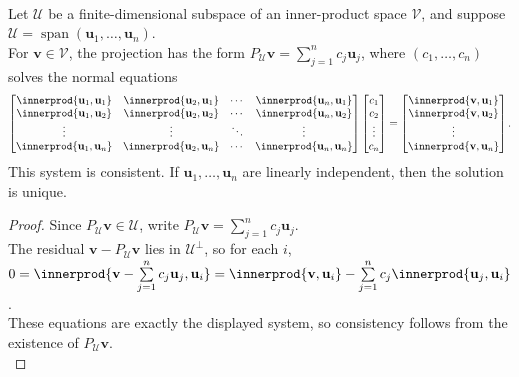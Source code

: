 \begin{theorem} \label{thm:normal-equations-for-projection} \\
Let $\mathcal{U}$ be a finite-dimensional subspace of an inner-product space $\mathcal{V}$, and suppose $\mathcal{U}=\operatorname{span}(\mathbf{u}_1,\ldots,\mathbf{u}_n)$.\\
For $\mathbf{v}\in\mathcal{V}$, the projection has the form $P_{\mathcal{U}}\mathbf{v}=\sum\limits_{j=1}^{n}c_j\mathbf{u}_j$, where $(c_1,\ldots,c_n)$ solves the normal equations
\begin{align}
\begin{bmatrix}
\innerprod{\mathbf{u}_1,\mathbf{u}_1} & \innerprod{\mathbf{u}_2,\mathbf{u}_1} & \cdots & \innerprod{\mathbf{u}_n,\mathbf{u}_1}\\
\innerprod{\mathbf{u}_1,\mathbf{u}_2} & \innerprod{\mathbf{u}_2,\mathbf{u}_2} & \cdots & \innerprod{\mathbf{u}_n,\mathbf{u}_2}\\
\vdots & \vdots & \ddots & \vdots\\
\innerprod{\mathbf{u}_1,\mathbf{u}_n} & \innerprod{\mathbf{u}_2,\mathbf{u}_n} & \cdots & \innerprod{\mathbf{u}_n,\mathbf{u}_n}
\end{bmatrix}
\begin{bmatrix}
c_1\\ c_2\\ \vdots\\ c_n
\end{bmatrix}
=
\begin{bmatrix}
\innerprod{\mathbf{v},\mathbf{u}_1}\\
\innerprod{\mathbf{v},\mathbf{u}_2}\\
\vdots\\
\innerprod{\mathbf{v},\mathbf{u}_n}
\end{bmatrix}.
\nonumber
\end{align}
This system is consistent. If $\mathbf{u}_1,\ldots,\mathbf{u}_n$ are linearly independent, then the solution is unique.
\begin{proof}
Since $P_{\mathcal{U}}\mathbf{v}\in\mathcal{U}$, write $P_{\mathcal{U}}\mathbf{v}=\sum_{j=1}^{n}c_j\mathbf{u}_j$.\\
The residual $\mathbf{v}-P_{\mathcal{U}}\mathbf{v}$ lies in $\mathcal{U}^{\perp}$, so for each $i$, $0=\innerprod{\mathbf{v}-\sum\limits_{j=1}^{n}c_j\mathbf{u}_j,\mathbf{u}_i} =\innerprod{\mathbf{v},\mathbf{u}_i}-\sum\limits_{j=1}^{n}c_j\innerprod{\mathbf{u}_j,\mathbf{u}_i}$.\\
These equations are exactly the displayed system, so consistency follows from the existence of $P_{\mathcal{U}}\mathbf{v}$.\\

\end{proof}
\end{theorem}
